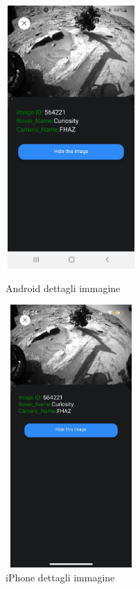 \begin{figure}[h]
    \begin{minipage}[h]{0.47\textwidth}
        \centering
        \includegraphics[width=5cm, height=10cm]{images/immaginiAndroid/imageDetail.jpg}
        \caption{\label{imageDetailAndroid} Android dettagli immagine}
    \end{minipage}
    \hfill
    \begin{minipage}[h]{0.47\textwidth}
        \centering
        \includegraphics[width=5cm, height=10cm]{images/immaginiPhone/imageDetail.jpeg}
        \caption{\label{imageDetailIphone}iPhone dettagli immagine}
    \end{minipage}
\end{figure}

